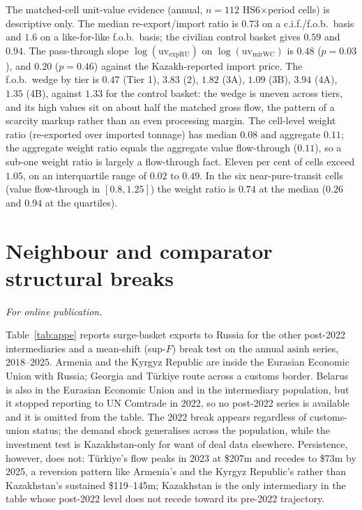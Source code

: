 \documentclass[12pt]{article}
\begin{document}
The matched-cell unit-value evidence (annual, $n = 112$ HS6$\times$period cells) is
descriptive only. The median re-export/import ratio is $0.73$ on a c.i.f./f.o.b.\ basis and
$1.6$ on a like-for-like f.o.b.\ basis; the civilian control basket gives $0.59$ and $0.94$.
The pass-through slope $\log(\text{uv}_{\text{expRU}})$ on $\log(\text{uv}_{\text{mirWC}})$ is
$0.48$ ($p = 0.03$), and $0.20$ ($p = 0.46$) against the Kazakh-reported import price. The
f.o.b.\ wedge by tier is $0.47$ (Tier 1), $3.83$ (2), $1.82$ (3A), $1.09$ (3B), $3.94$ (4A),
$1.35$ (4B), against $1.33$ for the control basket: the wedge is uneven across tiers, and its
high values sit on about half the matched gross flow, the pattern of a scarcity markup rather
than an even processing margin. The
cell-level weight ratio (re-exported over imported tonnage) has median $0.08$ and aggregate
$0.11$; the aggregate weight ratio equals the aggregate value flow-through ($0.11$), so a
sub-one weight ratio is largely a flow-through fact. Eleven per cent of cells exceed $1.05$,
on an interquartile range of $0.02$ to $0.49$. In the six near-pure-transit cells (value
flow-through in $[0.8, 1.25]$) the weight ratio is $0.74$ at the median ($0.26$ and $0.94$ at
the quartiles).

\section{Neighbour and comparator structural breaks}\label{app:breaks}
\emph{For online publication.}

\medskip
Table~\ref{tab:appe} reports surge-basket exports to Russia for the other post-2022
intermediaries and a mean-shift (sup-$F$) break test on the annual $\text{asinh}$ series,
$2018$--$2025$. Armenia and the Kyrgyz Republic are inside the Eurasian Economic
Union with Russia; Georgia and T\"urkiye route across a customs border. Belarus is also in the
Eurasian Economic Union and in the intermediary population, but it stopped reporting to UN
Comtrade in 2022, so no post-2022 series is available and it is omitted from the table. The
2022 break appears regardless of customs-union status; the demand shock generalises across the
population, while the investment test is Kazakhstan-only for want of deal data elsewhere.
Persistence, however, does not: T\"urkiye's flow peaks in 2023 at \$207m and recedes to \$73m
by 2025, a reversion pattern like Armenia's and the Kyrgyz Republic's rather than Kazakhstan's
sustained \$119--145m; Kazakhstan is the only intermediary in the table whose post-2022 level
does not recede toward its pre-2022 trajectory.
\end{document}
